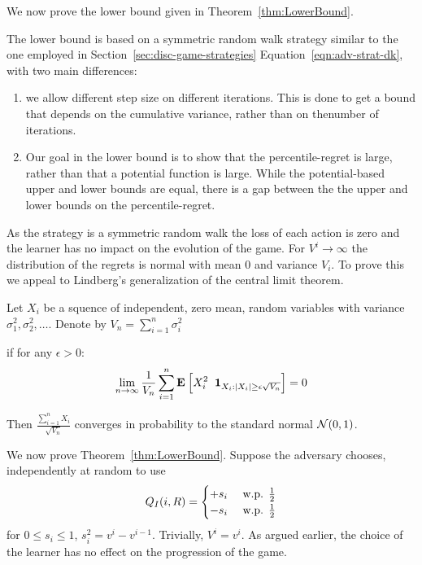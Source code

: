 \documentclass{article}[12pt]
\begin{document}
We now prove the lower bound given in Theorem~\ref{thm:LowerBound}.

The lower bound is based on a symmetric random walk strategy similar
to the one employed in Section~\ref{sec:disc-game-strategies}
Equation~\ref{eqn:adv-strat-dk}, with two main differences:
\begin{enumerate}
\item we allow different step size on different iterations. This is
  done to get a bound that depends on the cumulative variance, rather
  than on thenumber of iterations.
\item Our goal in the lower bound is to show that the
  percentile-regret is large, rather than that a potential function is
  large. While the potential-based upper and lower bounds are equal,
  there is a gap between the the upper and lower bounds on the
  percentile-regret.
\end{enumerate}


As the strategy is a symmetric random walk the loss of each action is
zero and the learner has no impact on the evolution of the game. For
$V^i \to \infty$ the distribution of the regrets is normal with mean 0
and variance $V_i$.  To prove this we appeal to Lindberg's
generalization of the central limit theorem.~\cite{billingsley1995central}
  
  \begin{theorem}
  Let $X_i$ be a squence of independent, zero mean, random variables with variance $\sigma_1^2,\sigma_2^2,\ldots$. Denote by $V_n  = \sum_{i=1}^n \sigma_i^2$

if for any $\epsilon>0$:
  \[
    \lim_{n \to \infty} \frac{1}{V_n} \sum_{i=1}^n {\bf E}_{}\left[ X_i^2 \;\;{\bf 1}_{X_i: |X_i| \geq \epsilon \sqrt{V_n}} \right]=0
  \]

 Then $\frac{\sum_{i=1}^n X_i}{\sqrt{V_n}}$ converges in probability to the standard normal ${\cal N}(0,1)$.
\end{theorem}

\noindent We now prove Theorem~\ref{thm:LowerBound}.
\proof
Suppose the adversary chooses, independently at random to use
\begin{equation}
Q_I(i,R) =
  \begin{cases}
    +s_i & \mbox{ w.p. } \frac{1}{2}\\
    -s_i & \mbox{ w.p. } \frac{1}{2}\\
  \end{cases}
\end{equation}
for $0 \leq s_i \leq 1$, $s_i^2 =  v^i - v^{i-1}$. Trivially, $V^i=v^i$. As argued earlier, the choice of the learner has no effect on the progression of the game.
\end{document}
